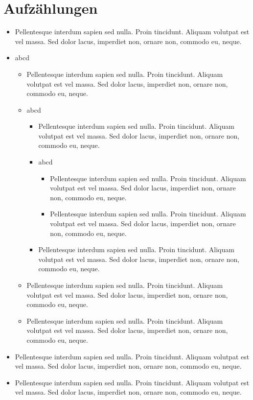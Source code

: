 \documentclass[ngerman]{scrartcl}
\begin{document}
	\section{Aufzählungen}

	\begin{itemize}
		\item Pellentesque interdum sapien sed nulla. Proin tincidunt. Aliquam volutpat est vel massa. Sed
dolor lacus, imperdiet non, ornare non, commodo eu, neque.
		\item abcd
			\begin{itemize}
				\item Pellentesque interdum sapien sed nulla. Proin tincidunt. Aliquam volutpat est vel massa. Sed
dolor lacus, imperdiet non, ornare non, commodo eu, neque.
				\item abcd
					\begin{itemize}
						\item Pellentesque interdum sapien sed nulla. Proin tincidunt. Aliquam volutpat est vel massa. Sed
dolor lacus, imperdiet non, ornare non, commodo eu, neque.
						\item abcd
							\begin{itemize}
								\item Pellentesque interdum sapien sed nulla. Proin tincidunt. Aliquam volutpat est vel massa. Sed
		dolor lacus, imperdiet non, ornare non, commodo eu, neque.
								\item Pellentesque interdum sapien sed nulla. Proin tincidunt. Aliquam volutpat est vel massa. Sed
		dolor lacus, imperdiet non, ornare non, commodo eu, neque.
							\end{itemize}
						\item Pellentesque interdum sapien sed nulla. Proin tincidunt. Aliquam volutpat est vel massa. Sed
dolor lacus, imperdiet non, ornare non, commodo eu, neque.
					\end{itemize}
				\item Pellentesque interdum sapien sed nulla. Proin tincidunt. Aliquam volutpat est vel massa. Sed
dolor lacus, imperdiet non, ornare non, commodo eu, neque.
				\item Pellentesque interdum sapien sed nulla. Proin tincidunt. Aliquam volutpat est vel massa. Sed
dolor lacus, imperdiet non, ornare non, commodo eu, neque.
			\end{itemize}
		\item Pellentesque interdum sapien sed nulla. Proin tincidunt. Aliquam volutpat est vel massa. Sed
dolor lacus, imperdiet non, ornare non, commodo eu, neque.
		\item Pellentesque interdum sapien sed nulla. Proin tincidunt. Aliquam volutpat est vel massa. Sed
dolor lacus, imperdiet non, ornare non, commodo eu, neque.
	\end{itemize}
\end{document}
